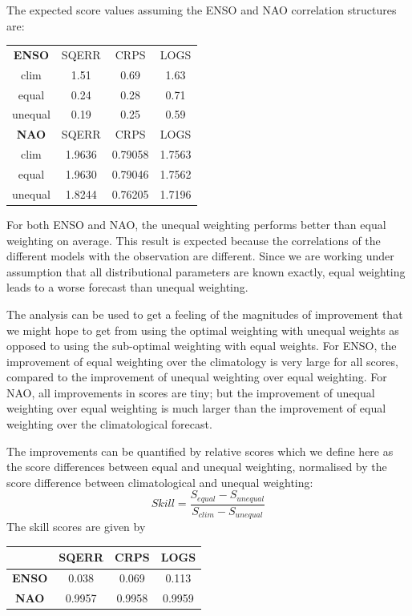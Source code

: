 \documentclass[12pt]{article}
\begin{document}
The expected score values assuming the ENSO and NAO correlation structures are:
%
\begin{center}
\begin{tabular}{cccc}
\textbf{ENSO} & SQERR & CRPS  & LOGS\\
clim    & 1.51 & 0.69 & 1.63\\
equal   & 0.24 & 0.28 & 0.71\\
unequal & 0.19 & 0.25 & 0.59\\
\hline
\textbf{NAO} & SQERR    & CRPS    & LOGS\\
clim    & 1.9636 & 0.79058 & 1.7563\\
equal   & 1.9630 & 0.79046 & 1.7562\\
unequal & 1.8244 & 0.76205 & 1.7196
\end{tabular}
\end{center}

For both ENSO and NAO, the unequal weighting performs better than equal weighting on average.
This result is expected because the correlations of the different models with the observation are different.
Since we are working under assumption that all distributional parameters are known exactly, equal weighting leads to a worse forecast than unequal weighting.

The analysis can be used to get a feeling of the magnitudes of improvement that we might hope to get from using the optimal weighting with unequal weights as opposed to using the sub-optimal weighting with equal weights. 
For ENSO, the improvement of equal weighting over the climatology is very large for all scores, compared to the improvement of unequal weighting over equal weighting.
For NAO, all improvements in scores are tiny; but the improvement of unequal weighting over equal weighting is much larger than the improvement of equal weighting over the climatological forecast.

The improvements can be quantified by relative scores which we define here as the score differences between equal and unequal weighting, normalised by the score difference between climatological and unequal weighting:
%
\begin{equation}
Skill = \frac{S_{equal} - S_{unequal}}{S_{clim} - S_{unequal}}
\end{equation}
%
The skill scores are given by
%
\begin{center}
\begin{tabular}{c|ccc}
& SQERR & CRPS &  LOGS \\
\hline
\textbf{ENSO} & 0.038 & 0.069 & 0.113 \\
\textbf{NAO} & 0.9957 & 0.9958 & 0.9959 
\end{tabular}
\end{center}
\end{document}
